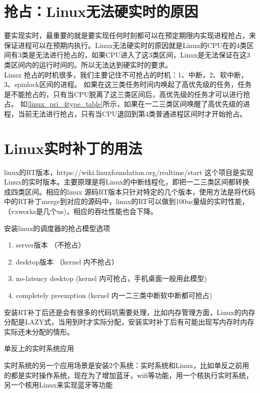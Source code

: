 \section{抢占：Linux无法硬实时的原因}
要实现实时，最重要的就是要实现任何时刻都可以在预定期限内实现进程抢占，来保证进程可以在预期内执行。Linux无法硬实时的原因就是Linux的CPU在的4类区间有3类是无法进行抢占的，如果CPU进入了这3类区间，Linux是无法保证在这3类区间内的运行时间的。所以无法达到硬实时的要求。\\Linux
抢占的时机很多，我们主要记住不可抢占的时机：1、中断，2、软中断，3、spinlock区间的进程。
如果在这三类任务时间内唤起了高优先级的任务，任务是不能抢占的，只有当CPU脱离了这三类区间后，高优先级的任务才可以进行抢占。
如\ref{linux_pri_4type_table}所示，如果在一二三类区间唤醒了高优先级的进程，当前无法进行抢占，只有当CPU退回到第4类普通进程区间时才开始抢占。

\section{Linux实时补丁的用法}
linux的RT版本，https://wiki.linuxfoundation.org/realtime/start 这个项目是实现Linux的实时版本。主要原理是将Linux的中断线程化，即把一二三类区间都转换成四类区间。相应的linux 源码RT版本只针对特定的几个版本，使用方法是将代码中的RT补丁merge到对应的源码中，linux的RT可以做到100us量级的实时性能，（vxworks是几个us)，相应的吞吐性能也会下降。

安装linux的调度器的抢占模型选项
\begin{enumerate}
  \item server版本 （不抢占）
  \item desktop版本 （kernel 内不抢占）
  \item no-latency desktop (kernel 内可抢占，手机桌面一般用此模型)
  \item completely preemption (kernel 内一二三类中断软中断都可抢占)
\end{enumerate}


安装RT补丁后还是会有很多的代码坑需要处理，比如内存管理方面，Linux的内存分配是LAZY式，当用到时才实际分配，安装实时补丁后有可能出现写内存时内存实际还未分配的情形。
\begin{tcolorbox}[colback=blue!5,colframe=blue!75!black,title=Linux无法实时的原因视频]
\end{tcolorbox}
 
 
\begin{example*}
  \wdexpbox
  {\caption{单反上的实时系统应用}}
  {实时系统的另一个应用场景是安装2个系统：实时系统和Linux，比如单反之前用的都是实时操作系统，现在为了增加蓝牙，wifi等功能，用一个核执行实时系统，另一个核用Linux来实现蓝牙等功能}
\end{example*}

